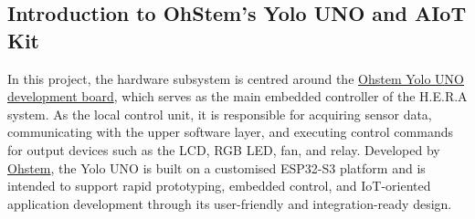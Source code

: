









\subsection{Introduction to OhStem's Yolo UNO and AIoT Kit}

In this project, the hardware subsystem is centred around the \href{https://ohstem.vn/product/yolo-uno/}{Ohstem Yolo UNO development board}, which serves as the main embedded controller of the H.E.R.A system. As the local control unit, it is responsible for acquiring sensor data, communicating with the upper software layer, and executing control commands for output devices such as the LCD, RGB LED, fan, and relay. Developed by \href{https://ohstem.vn/}{Ohstem}, the Yolo UNO is built on a customised ESP32-S3 platform and is intended to support rapid prototyping, embedded control, and IoT-oriented application development through its user-friendly and integration-ready design. \\

